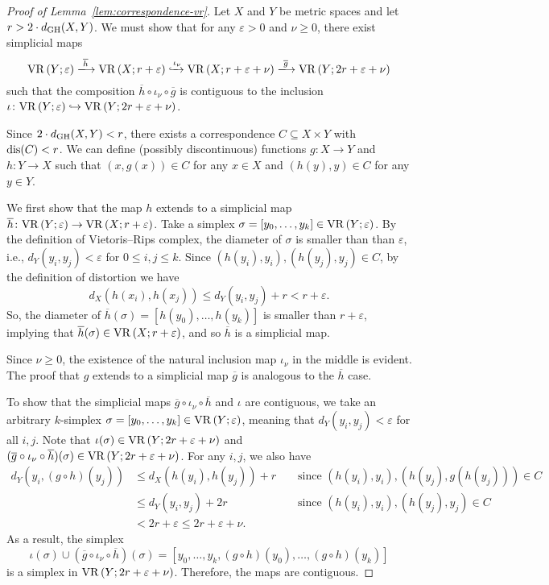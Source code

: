 \documentclass[11pt, reqno, english]{amsart}
\newcommand{\og}{\overline{g}}
\newcommand{\oh}{\overline{h}}
\begin{document}
\begin{proof}[Proof of Lemma~\ref{lem:correspondence-vr}]
Let $X$ and $Y$ be metric spaces and let $r > 2\cdot d_{\mathrm{GH}}(X,Y)$.
We must show that for any $\varepsilon > 0$ and $\nu\geq0$, there exist simplicial maps
\[\vr{Y}{\varepsilon} \xlongrightarrow{\oh} \vr{X}{r+\varepsilon}
\xhookrightarrow{\iota_\nu}
\vr{X}{r+\varepsilon+\nu}
\xlongrightarrow{\og} \vr{Y}{2r+\varepsilon+\nu}\] 
such that the composition $\oh\circ\iota_\nu\circ\og$ is contiguous to the inclusion $\iota\colon\mathrm{VR}\left(Y;\varepsilon\right)\hookrightarrow\mathrm{VR}\left(Y;2r+\varepsilon+\nu\right)$.

Since $2\cdot d_{\mathrm{GH}}(X,Y)<r$, there exists a correspondence $C\subseteq X\times Y$ with $\mathrm{dis}(C)<r$.
We can define (possibly discontinuous) functions $g\colon X\to Y$ and $h\colon Y\to X$ such that $(x,g(x))\in C$ for any $x\in X$ and $(h(y),y)\in C$ for any $y\in Y$.

We first show that the map $h$ extends to a simplicial map
$\oh\colon \vr{Y}{\varepsilon}\to \vr{X}{r+\varepsilon}$.
Take a simplex $\sigma=[y_0,\ldots,y_k]\in\mathrm{VR}\left(Y;\varepsilon\right)$. 
By the definition of Vietoris--Rips complex, the diameter of $\sigma$ is smaller than than $\varepsilon$, i.e., $d_Y(y_i,y_j)<\varepsilon$ for $0 \le i,j \le k$.
Since $(h(y_i),y_i),(h(y_j),y_j)\in C$, by the definition of distortion we have
\[
d_X(h(x_i),h(x_j))\leq d_Y(y_i,y_j)+r < r+\varepsilon.
\]
So, the diameter of $\oh(\sigma)=[h(y_0),\ldots,h(y_k)]$ is smaller than $r+\varepsilon$, implying that $\oh(\sigma)\in\vr{X}{r+\varepsilon}$, and so $\oh$ is a simplicial map.

Since $\nu\geq0$, the existence of the natural inclusion map $\iota_\nu$ in the middle is evident.
The proof that $g$ extends to a simplicial map $\og$ is analogous to the $\oh$ case.

To show that the simplicial maps $\og\circ\iota_\nu\circ\oh$ and $\iota$ are contiguous, we take an arbitrary $k$-simplex $\sigma=[y_0,\ldots,y_k]\in\mathrm{VR}\left(Y;\varepsilon\right)$, meaning that $d_Y(y_i,y_j) < \varepsilon$ for all $i,j$.
Note that $\iota(\sigma)\in \mathrm{VR}\left(Y;2r+\varepsilon+\nu\right)$ and $(\og\circ\iota_\nu\circ\oh)(\sigma) \in\vr{Y}{2r+\varepsilon+\nu}$.
For any $i,j$, we also have
\begin{align*}
d_Y(y_i,(g\circ h)(y_j))
&\leq d_X(h(y_i),h(y_j))+r && \text{ since }(h(y_i),y_i),(h(y_j),g(h(y_j)))\in C \\
&\leq d_Y(y_i,y_j)+ 2r && \text{ since }(h(y_i),y_i),(h(y_j),y_j)\in C  \\
& < 2r+\varepsilon \leq 2r+\varepsilon+\nu.
\end{align*}
As a result, the simplex 
\[
    \iota(\sigma)\cup(\og\circ\iota_\nu\circ\oh)(\sigma)=[y_0,\ldots,y_k,(g\circ h)(y_0),\ldots,(g\circ h)(y_k)]
\]
is a simplex in $\mathrm{VR}\left(Y;2r+\varepsilon+\nu\right)$.
Therefore, the maps are contiguous.
\end{proof}
\end{document}
